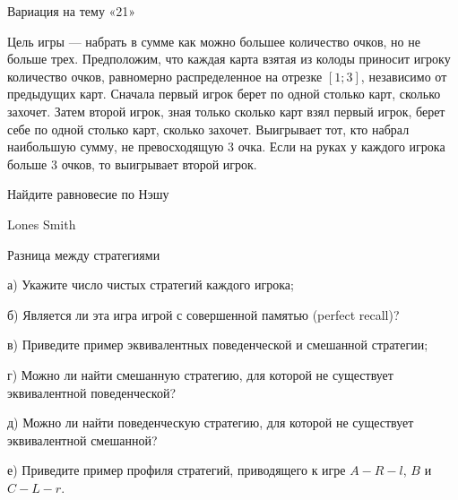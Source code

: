 \begin{problem}
 Вариация на тему «21» \par
Цель игры — набрать в сумме как можно большее количество очков, но не больше трех. Предположим, что каждая карта взятая из колоды приносит игроку количество очков, равномерно распределенное на отрезке $[1;3]$, независимо от предыдущих карт. Сначала первый игрок берет по одной столько карт, сколько захочет. Затем второй игрок, зная только сколько карт взял первый игрок, берет себе по одной столько карт, сколько захочет. Выигрывает тот, кто набрал наибольшую сумму, не превосходящую 3 очка. Если на руках у каждого игрока больше 3 очков, то выигрывает второй игрок. \par
Найдите равновесие по Нэшу



\begin{source}
Lones Smith
\end{source}


\begin{sol}

\end{sol}
\end{problem}



\begin{problem}
 Разница между стратегиями\par

а) Укажите число чистых стратегий каждого игрока;\par
б) Является ли эта игра игрой с совершенной памятью (perfect recall)?\par
в) Приведите пример эквивалентных поведенческой и смешанной стратегии; \par
г) Можно ли найти смешанную стратегию, для которой не существует эквивалентной поведенческой? \par
д) Можно ли найти поведенческую стратегию, для которой не существует эквивалентной смешанной? \par
е) Приведите пример профиля стратегий, приводящего к игре  $A-R-l$,  $B$  и  $C-L-r$.



\begin{sol}

\end{sol}
\end{problem}




